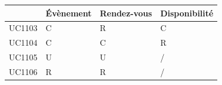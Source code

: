 \begin{center}
	\begin{longtable}{|p{2.2cm}|p{2.2cm}|p{2.2cm}|p{2.2cm}|}
		\hline
		& Évènement & Rendez-vous & Disponibilité  \\
		\hline
		UC1103 & C & R & C \\
		\hline 
		UC1104 & C & C & R \\
		\hline
		UC1105 & U & U & / \\
		\hline
		UC1106 & R & R & / \\
		\hline

	\end{longtable}
\end{center}
